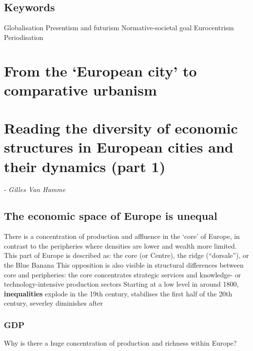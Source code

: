 \documentclass{article}
\begin{document}
\subsection{Keywords}

Globalisation
Presentism and futurism
Normative-societal goal
Eurocentrism
Periodisation


\section{From the `European city' to comparative urbanism}
\date{November th, 2021}


\section{Reading the diversity of economic structures in European cities and their dynamics (part 1)}
\date{October 18th, 2021} - \textit{Gilles Van Hamme}

\subsection{The economic space of Europe is unequal}

\begin{outline}
	\1 There is a concentration of production and affluence in the `core' of Europe, in contrast to the peripheries where densities are lower and wealth more limited. This part of Europe is described as: the core (or Centre), the ridge (``dorsale''), or the Blue Banana
	\1 This opposition is also visible in structural differences between core and peripheries: the core concentrates strategic services and knowledge- or technology-intensive production sectors
	\1 Starting at a low level in around 1800, \textbf{inequalities} explode in the 19th century, stabilises the first half of the 20th century, severley diminishes after
\end{outline}

\subsubsection{GDP}

Why is there a huge concentration of production and richness within Europe?
\end{document}
